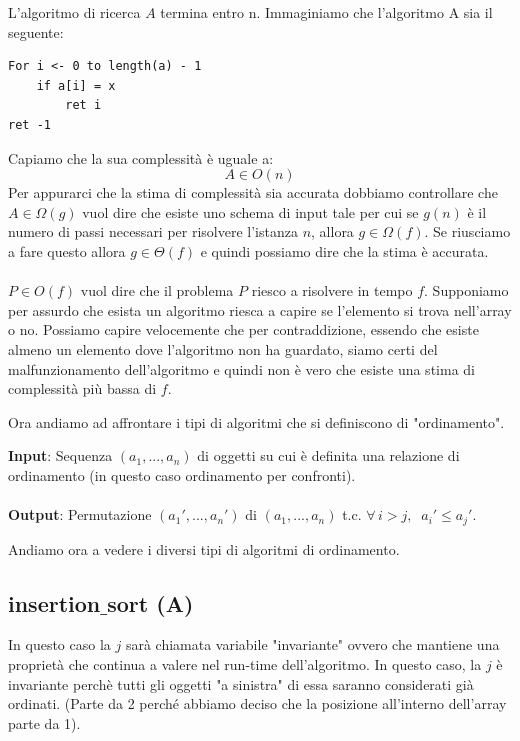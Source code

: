 \documentclass[a4paper]{article}
\begin{document}
L'algoritmo di ricerca $A$ termina entro n. Immaginiamo che l'algoritmo A sia il seguente:
\begin{lstlisting}
For i <- 0 to length(a) - 1
    if a[i] = x
        ret i
ret -1
\end{lstlisting}
Capiamo che la sua complessità è uguale a:
\[A \in O(n)\]
Per appurarci che la stima di complessità sia accurata dobbiamo controllare che $A \in \Omega(g)$ vuol dire che esiste uno schema di input tale per cui se $g(n)$ è il numero di passi necessari per risolvere l'istanza $n$, allora $g \in \Omega(f)$. Se riusciamo a fare questo allora $g \in \Theta(f)$ e quindi possiamo dire che la stima è accurata.
\\\\
$P \in O(f)$ vuol dire che il problema $P$ riesco a risolvere in tempo $f$. Supponiamo per assurdo che esista un algoritmo riesca a capire se l'elemento si trova nell'array o no. Possiamo capire velocemente che per contraddizione, essendo che esiste almeno un elemento dove l'algoritmo non ha guardato, siamo certi del malfunzionamento dell'algoritmo e quindi non è vero che esiste una stima di complessità più bassa di $f$.


Ora andiamo ad affrontare i tipi di algoritmi che si definiscono di "ordinamento".
\begin{definition}
\textbf{Input}: Sequenza $(a_1, ..., a_n)$ di oggetti su cui è definita una relazione di ordinamento (in questo caso ordinamento per confronti).
\\\\
\textbf{Output}: Permutazione $(a_1', ..., a_n')$ di $(a_1, ..., a_n)$ t.c. $\forall \, i > j, \; \; a_i' \le a_j'$.
\end{definition}
Andiamo ora a vedere i diversi tipi di algoritmi di ordinamento.

\subsection{insertion$\_$sort (A)}

In questo caso la $j$ sarà chiamata variabile "invariante" ovvero che mantiene una proprietà che continua a valere nel run-time dell'algoritmo. In questo caso, la $j$ è invariante perchè tutti gli oggetti "a sinistra" di essa saranno considerati già ordinati. (Parte da 2 perché abbiamo deciso che la posizione all'interno dell'array parte da 1).
\end{document}
